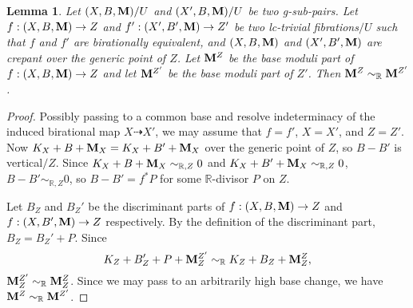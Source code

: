 \documentclass[11pt]{amsart}
\numberwithin{equation}{section}
\newcommand{\Mm}{{\bf{M}}}
\newcommand{\Rr}{\mathbb{R}}
\newtheorem{lem}[thm]{Lemma}
\theoremstyle{definition}
\theoremstyle{definition}
\theoremstyle{definition}
\begin{document}
\begin{lem}\label{lem: m preserved under crepant}
    Let $(X,B,\Mm)/U$ and $(X',B,\Mm)/U$ be two g-sub-pairs. Let $f: (X,B,\Mm)\rightarrow Z$ and $f': (X',B',\Mm)\rightarrow Z'$ be two lc-trivial fibrations$/U$ such that $f$ and $f'$ are birationally equivalent, and $(X,B,\Mm)$ and $(X',B',\Mm)$ are crepant over the generic point of $Z$. Let $\Mm^Z$ be the base moduli part of $f: (X,B,\Mm)\rightarrow Z$  and let $\Mm^{Z'}$ be the base moduli part of $Z'$. Then $\Mm^Z\sim_{\mathbb R}\Mm^{Z'}$.
\end{lem}
\begin{proof}
Possibly passing to a common base and resolve indeterminacy of the induced birational map $X\dashrightarrow X'$, we may assume that $f=f'$, $X=X'$, and $Z=Z'$. Now $K_X+B+\Mm_X=K_{X}+B'+\Mm_X$ over the generic point of $Z$, so $B-B'$ is vertical$/Z$. Since $K_X+B+\Mm_X\sim_{\mathbb R,Z}0$ and $K_{X}+B'+\Mm_X\sim_{\mathbb R,Z}0$, $B-B'\sim_{\mathbb R,Z}0$, so $B-B'=f^*P$ for some $\Rr$-divisor $P$ on $Z$.

Let $B_Z$ and $B_Z'$ be the discriminant parts of $f: (X,B,\Mm)\rightarrow Z$ and $f: (X,B',\Mm)\rightarrow Z$ respectively. By the definition of the discriminant part, $B_Z=B_Z'+P$. Since
$$K_Z+B_Z'+P+\Mm^{Z'}_{Z}\sim_{\mathbb R}K_Z+B_Z+\Mm^Z_Z,$$
$\Mm^{Z'}_{Z}\sim_{\mathbb R}\Mm^Z_Z$. Since we may pass to an arbitrarily high base change, we have $\Mm^Z\sim_{\mathbb R}\Mm^{Z'}$.
\end{proof}
\end{document}

